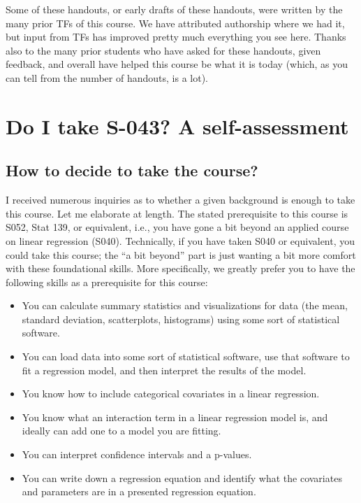 \documentclass[
  letterpaper,
  DIV=11,
  numbers=noendperiod]{scrreprt}
\begin{document}

Some of these handouts, or early drafts of these handouts, were written
by the many prior TFs of this course. We have attributed authorship
where we had it, but input from TFs has improved pretty much everything
you see here. Thanks also to the many prior students who have asked for
these handouts, given feedback, and overall have helped this course be
what it is today (which, as you can tell from the number of handouts, is
a lot).


\hypertarget{do-i-take-s-043-a-self-assessment}{%
\chapter{Do I take S-043? A
self-assessment}\label{do-i-take-s-043-a-self-assessment}}

\hypertarget{how-to-decide-to-take-the-course}{%
\section{How to decide to take the
course?}\label{how-to-decide-to-take-the-course}}

I received numerous inquiries as to whether a given background is enough
to take this course. Let me elaborate at length. The stated prerequisite
to this course is S052, Stat 139, or equivalent, i.e., you have gone a
bit beyond an applied course on linear regression (S040). Technically,
if you have taken S040 or equivalent, you could take this course; the
``a bit beyond'' part is just wanting a bit more comfort with these
foundational skills. More specifically, we greatly prefer you to have
the following skills as a prerequisite for this course:

\begin{itemize}
\item
  You can calculate summary statistics and visualizations for data (the
  mean, standard deviation, scatterplots, histograms) using some sort of
  statistical software.
\item
  You can load data into some sort of statistical software, use that
  software to fit a regression model, and then interpret the results of
  the model.
\item
  You know how to include categorical covariates in a linear regression.
\item
  You know what an interaction term in a linear regression model is, and
  ideally can add one to a model you are fitting.
\item
  You can interpret confidence intervals and a p-values.
\item
  You can write down a regression equation and identify what the
  covariates and parameters are in a presented regression equation.
\end{itemize}
\end{document}
